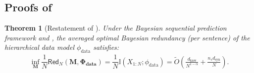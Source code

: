 \documentclass[11pt]{article}
\theoremstyle{plain}
\newtheorem{theorem}{Theorem}[section]
\theoremstyle{definition}
\newcommand{\redundency}{\mathsf{Red}}
\newcommand{\Model}{\boldsymbol{M}}
\newcommand{\dataModel}{\phi_{\text{data}}}
\newcommand{\synModel}{\phi_{\text{syn}}}
\newcommand{\datafamily}{\mathbf{\Phi_{\text{data}}}}
\newcommand{\knwdimension}{d_{\text{knw}}}
\newcommand{\syndimension}{d_{\text{syn}}}
\begin{document}
\subsection{\texorpdfstring{Proofs of }{Proofs of \ref{sec:baye data law}}}
\begin{theorem}[Restatement of ]
Under the Bayesian sequential prediction framework and , the averaged optimal Bayesian redundancy (per sentence) of the hierarchical data model $\dataModel$  satisfies:
    \begin{align*}
    \inf_{\Model}\dfrac{1}{N}\redundency_N(\Model,\datafamily)=\dfrac{1}{N}\mathbb{I}(X_{1:N}; \dataModel) = 
    \widetilde{O}\left(\frac{\knwdimension}{N^{1-\alpha}}+\frac{ n_s\syndimension}{N}\right).
    \end{align*}
\end{theorem}
\end{document}
